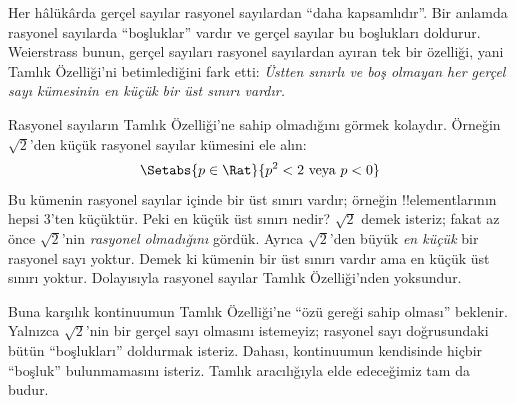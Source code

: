 \documentclass[../../../include/open-logic-section]{subfiles}
\begin{document}
Her hâlükârda gerçel sayılar rasyonel sayılardan “daha kapsamlıdır”. Bir
anlamda rasyonel sayılarda “boşluklar” vardır ve gerçel sayılar bu boşlukları
doldurur. Weierstrass bunun, gerçel sayıları rasyonel sayılardan ayıran tek bir
özelliği, yani Tamlık Özelliği'ni betimlediğini fark etti:
\emph{Üstten sınırlı ve boş olmayan her gerçel sayı kümesinin en küçük bir üst
sınırı vardır.}

Rasyonel sayıların Tamlık Özelliği'ne sahip olmadığını görmek kolaydır.
Örneğin $\sqrt{2}$'den küçük rasyonel sayılar kümesini ele alın:
\[
	\Setabs{p \in \Rat}{p^2 < 2 \text{ veya }p < 0}
\]
Bu kümenin rasyonel sayılar içinde bir üst sınırı vardır; örneğin
!!{element}larının hepsi $3$'ten küçüktür. Peki en küçük üst sınırı nedir?
$\sqrt{2}$ demek isteriz; fakat az önce $\sqrt{2}$'nin \emph{rasyonel
olmadığını} gördük. Ayrıca $\sqrt{2}$'den büyük \emph{en küçük} bir rasyonel
sayı yoktur. Demek ki kümenin bir üst sınırı vardır ama en küçük üst sınırı
yoktur. Dolayısıyla rasyonel sayılar Tamlık Özelliği'nden yoksundur.

Buna karşılık kontinuumun Tamlık Özelliği'ne “özü gereği sahip olması”
beklenir. Yalnızca $\sqrt{2}$'nin bir gerçel sayı olmasını istemeyiz; rasyonel
sayı doğrusundaki bütün “boşlukları” doldurmak isteriz. Dahası, kontinuumun
kendisinde hiçbir “boşluk” bulunmamasını isteriz. Tamlık aracılığıyla elde
edeceğimiz tam da budur.
\end{document}
